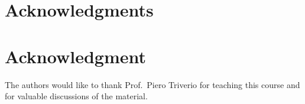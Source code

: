 \documentclass[12pt,journal,compsoc]{../ieeepaper/IEEEtran}
\begin{document}
%




\ifCLASSOPTIONcompsoc
  \section*{Acknowledgments}
\else
  \section*{Acknowledgment}
\fi


The authors would like to thank Prof.\ Piero Triverio for teaching this course and for valuable discussions of the material.

\ifCLASSOPTIONcaptionsoff
  \newpage
\fi





%
%
%
%
%
\end{document}

